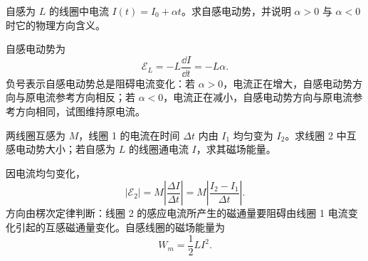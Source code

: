 \begin{exercise}[level=basic]
自感为 $L$ 的线圈中电流 $I(t)=I_0+\alpha t$。求自感电动势，并说明 $\alpha>0$ 与 $\alpha<0$ 时它的物理方向含义。
\begin{solution}
自感电动势为
\[
  \mathcal E_L=-L\frac{\dd I}{\dd t}=-L\alpha.
\]
负号表示自感电动势总是阻碍电流变化：若 $\alpha>0$，电流正在增大，自感电动势方向与原电流参考方向相反；若 $\alpha<0$，电流正在减小，自感电动势方向与原电流参考方向相同，试图维持原电流。
\end{solution}
\end{exercise}

\begin{exercise}[level=standard]
两线圈互感为 $M$，线圈 1 的电流在时间 $\Delta t$ 内由 $I_1$ 均匀变为 $I_2$。求线圈 2 中互感电动势大小；若自感为 $L$ 的线圈通电流 $I$，求其磁场能量。
\begin{solution}
因电流均匀变化，
\[
  |\mathcal E_2|=M\left|\frac{\Delta I}{\Delta t}\right|
  =M\left|\frac{I_2-I_1}{\Delta t}\right|.
\]
方向由楞次定律判断：线圈 2 的感应电流所产生的磁通量要阻碍由线圈 1 电流变化引起的互感磁通量变化。自感线圈的磁场能量为
\[
  W_m=\frac12LI^2.
\]
\end{solution}
\end{exercise}

